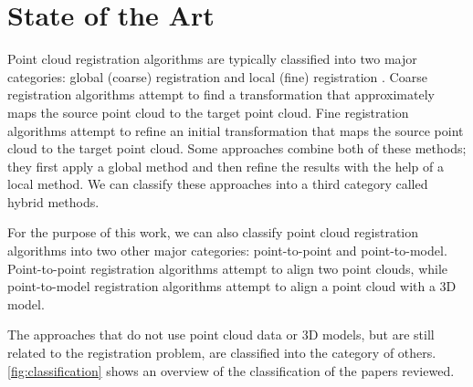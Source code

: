 

    \chapter{State of the Art}
    \label{chap:State of the Art}
    Point cloud registration algorithms are typically classified into two major categories: global (coarse) registration and local (fine) registration \cite{Quan_2020_com,Kim_2011_fully}.
    Coarse registration algorithms attempt to find a transformation that approximately maps the source point cloud to the target point cloud. 
    Fine registration algorithms attempt to refine an initial transformation that maps the source point cloud to the target point cloud.
    Some approaches combine both of these methods; they first apply a global method and then refine the results with the help of a local method. 
    We can classify these approaches into a third category called hybrid methods. 
    \par
    
    For the purpose of this work, we can also classify point cloud registration algorithms into two other major categories:
    point-to-point and point-to-model.
    Point-to-point registration algorithms attempt to align two point clouds, while point-to-model registration algorithms attempt to align a point cloud with a 3D model.

    The approaches that do not use point cloud data or 3D models, but are still related to the registration problem, are classified into the category of others.
    \autoref{fig:classification} shows an overview of the classification of the papers reviewed.
    
